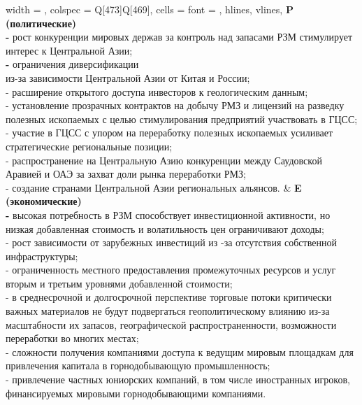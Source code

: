 \begin{longtblr}[
  label = none,
  entry = none,
]{
  width = \linewidth,
  colspec = {Q[473]Q[469]},
  cells = {font = \footnotesize},
  hlines,
  vlines,
}
{\textbf{P (политические)}\\\textbf{-} рост конкуренции мировых держав за контроль над запасами РЗМ стимулирует интерес к Центральной Азии;\\\textbf{- }ограничения диверсификации\\из-за зависимости Центральной Азии от Китая и России;\\- расширение открытого доступа инвесторов к геологическим данным;\\- установление прозрачных контрактов на добычу РМЗ и лицензий на разведку полезных ископаемых с целью стимулирования предприятий участвовать в ГЦСС;\\- участие в ГЦСС с упором на переработку полезных ископаемых усиливает стратегические региональные позиции;\\- распространение на Центральную Азию конкуренции между Саудовской Аравией и ОАЭ за захват доли рынка переработки РМЗ;\\- создание странами Центральной Азии региональных альянсов.} & {\textbf{E (экономические)}\\\textbf{-} высокая потребность в РЗМ способствует инвестиционной активности, но низкая добавленная стоимость и волатильность цен ограничивают доходы;\\- рост зависимости от зарубежных инвестиций из -за отсутствия собственной инфраструктуры;\\- ограниченность местного предоставления промежуточных ресурсов и услуг вторым и третьим уровнями добавленной стоимости;\\- в среднесрочной и долгосрочной перспективе торговые потоки критически важных материалов не будут подвергаться геополитическому влиянию из-за масштабности их запасов, географической распространенности, возможности переработки во многих местах;\\- сложности получения компаниями доступа к ведущим мировым площадкам для привлечения капитала в горнодобывающую промышленность;\\- привлечение частных юниорских компаний, в том числе иностранных игроков, финансируемых мировыми горнодобывающими компаниями.} \\

\end{longtblr}

